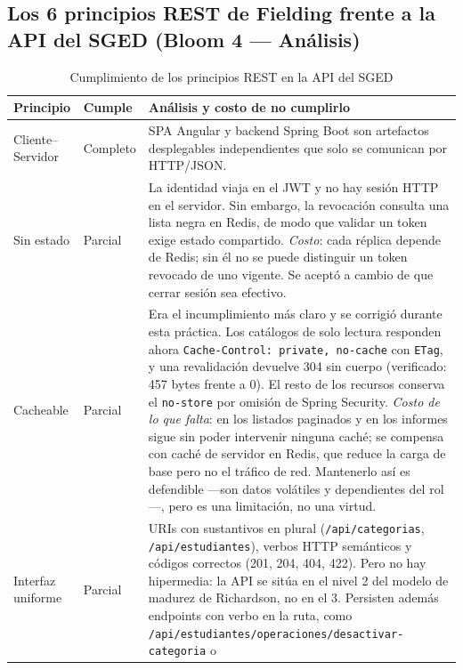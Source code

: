 \documentclass[12pt,a4paper]{article}
\begin{document}
\subsection{Los 6 principios REST de Fielding frente a la API del SGED (Bloom 4 --- Análisis)}

\begin{table}[h!]
  \centering
  \caption{Cumplimiento de los principios REST \parencite{fielding2000} en la API del SGED}
  \label{tab:fielding}
  \begin{tabularx}{\linewidth}{@{}L{2.9cm}L{1.9cm}L{8.6cm}@{}}
    \toprule
    \textbf{Principio} & \textbf{Cumple} & \textbf{Análisis y costo de no cumplirlo} \\
    \midrule
    Cliente--Servidor & Completo &
      SPA Angular y backend Spring Boot son artefactos desplegables independientes que solo se
      comunican por HTTP/JSON. \\[3pt]
    Sin estado & Parcial &
      La identidad viaja en el JWT y no hay sesión HTTP en el servidor. Sin embargo, la
      revocación consulta una lista negra en Redis, de modo que validar un token exige estado
      compartido. \textit{Costo}: cada réplica depende de Redis; sin él no se puede distinguir un
      token revocado de uno vigente. Se aceptó a cambio de que cerrar sesión sea efectivo. \\[3pt]
    Cacheable & Parcial &
      Era el incumplimiento más claro y se corrigió durante esta práctica. Los catálogos de solo
      lectura responden ahora \texttt{Cache-Control: private, no-cache} con \texttt{ETag}, y una
      revalidación devuelve 304 sin cuerpo (verificado: 457 bytes frente a 0). El resto de los
      recursos conserva el \texttt{no-store} por omisión de Spring Security. \textit{Costo de lo
      que falta}: en los listados paginados y en los informes sigue sin poder intervenir ninguna
      caché; se compensa con caché de servidor en Redis, que reduce la carga de base pero no el
      tráfico de red. Mantenerlo así es defendible ---son datos volátiles y dependientes del
      rol---, pero es una limitación, no una virtud. \\[3pt]
    Interfaz uniforme & Parcial &
      URIs con sustantivos en plural (\texttt{/api/categorias}, \texttt{/api/estudiantes}),
      verbos HTTP semánticos y códigos correctos (201, 204, 404, 422). Pero no hay hipermedia:
      la API se sitúa en el nivel 2 del modelo de madurez de Richardson, no en el 3. Persisten
      además endpoints con verbo en la ruta, como
      \texttt{/api/estudiantes/operaciones/desactivar-categoria} o

\end{tabularx}
\end{table}
\end{document}
